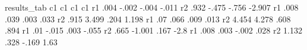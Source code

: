 	results_tab			
	c1	c1	c1	c1
r1	.004	-.002	-.004	-.011
r2	.932	-.475	-.756	-2.907
r1	.008	.039	.003	.033
r2	.915	3.499	.204	1.198
r1	.07	.066	.009	.013
r2	4.454	4.278	.608	.894
r1	.01	-.015	.003	-.055
r2	.665	-1.001	.167	-2.8
r1	.008	.003	-.002	.028
r2	1.132	.328	-.169	1.63
